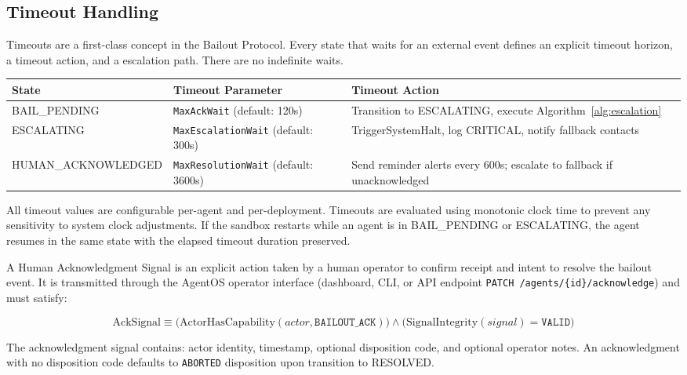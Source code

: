 \bigskip
\subsection{Timeout Handling}

Timeouts are a first-class concept in the Bailout Protocol. Every state that waits for an external event defines an explicit timeout horizon, a timeout action, and a escalation path. There are no indefinite waits.

\bigskip
\begin{tabular}{llp{6cm}}
\toprule
\textbf{State} & \textbf{Timeout Parameter} & \textbf{Timeout Action} \\
\midrule
BAIL\_PENDING & \texttt{MaxAckWait} (default: 120s) & Transition to ESCALATING, execute Algorithm~\ref{alg:escalation} \\
ESCALATING & \texttt{MaxEscalationWait} (default: 300s) & TriggerSystemHalt, log CRITICAL, notify fallback contacts \\
HUMAN\_ACKNOWLEDGED & \texttt{MaxResolutionWait} (default: 3600s) & Send reminder alerts every 600s; escalate to fallback if unacknowledged \\
\bottomrule
\end{tabular}

\bigskip
\begin{note}
All timeout values are configurable per-agent and per-deployment. Timeouts are evaluated using monotonic clock time to prevent any sensitivity to system clock adjustments. If the sandbox restarts while an agent is in BAIL\_PENDING or ESCALATING, the agent resumes in the same state with the elapsed timeout duration preserved.
\end{note}

\bigskip
\begin{definition}\label{def:ack_signal}
A Human Acknowledgment Signal is an explicit action taken by a human operator to confirm receipt and intent to resolve the bailout event. It is transmitted through the AgentOS operator interface (dashboard, CLI, or API endpoint \texttt{PATCH /agents/\{id\}/acknowledge}) and must satisfy:

\[
\text{AckSignal} \equiv \big(\text{ActorHasCapability}(actor, \texttt{BAILOUT\_ACK}) \big) \land \big( \text{SignalIntegrity}(signal) = \texttt{VALID} \big)
\]

The acknowledgment signal contains: actor identity, timestamp, optional disposition code, and optional operator notes. An acknowledgment with no disposition code defaults to \texttt{ABORTED} disposition upon transition to RESOLVED.
\end{definition}

